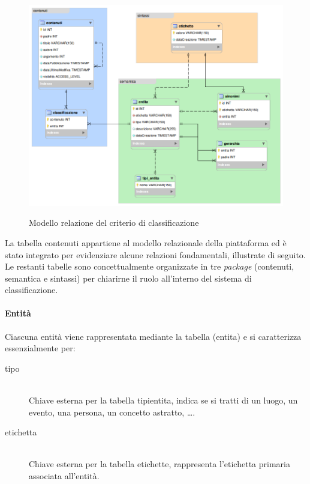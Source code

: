 \begin{figure}[ht]
\begin{center}
\includegraphics[width=14.7cm]{modello-er.png}
\label{fig:tesi:stage:er:modello}
\caption{Modello relazione del criterio di classificazione}
\end{center}
\end{figure}

La tabella \textsf{contenuti} appartiene al modello relazionale della piattaforma ed è stato integrato per evidenziare alcune relazioni fondamentali, illustrate di seguito. Le restanti tabelle sono concettualmente organizzate in tre \textit{package} (\textsf{contenuti}, \textsf{semantica} e \textsf{sintassi}) per chiarirne il ruolo all'interno del sistema di classificazione.

\paragraph{Entità}
Ciascuna entità viene rappresentata mediante la tabella (\textsf{entita}) e si caratterizza essenzialmente per:
\begin{description}
\item[tipo] \hfill \\
Chiave esterna per la tabella \textsf{tipi\textunderscore entita}, indica se si tratti di un luogo, un evento, una persona, un concetto astratto, \ldots. 
\item[etichetta] \hfill \\
Chiave esterna per la tabella \textsf{etichette}, rappresenta l'etichetta primaria associata all'entità.
\end{description}

